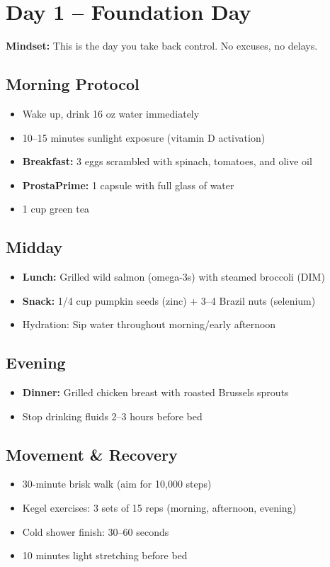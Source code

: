 \documentclass[11pt,oneside]{book}
\begin{document}
\clearpage
\chapter*{Day 1 – Foundation Day}

\textbf{Mindset:} This is the day you take back control. No excuses, no delays.

\section*{Morning Protocol}
\begin{itemize}[leftmargin=*]
\item Wake up, drink 16 oz water immediately
\item 10--15 minutes sunlight exposure (vitamin D activation)
\item \textbf{Breakfast:} 3 eggs scrambled with spinach, tomatoes, and olive oil
\item \textbf{ProstaPrime:} 1 capsule with full glass of water
\item 1 cup green tea
\end{itemize}

\section*{Midday}
\begin{itemize}[leftmargin=*]
\item \textbf{Lunch:} Grilled wild salmon (omega-3s) with steamed broccoli (DIM)
\item \textbf{Snack:} 1/4 cup pumpkin seeds (zinc) + 3--4 Brazil nuts (selenium)
\item Hydration: Sip water throughout morning/early afternoon
\end{itemize}

\section*{Evening}
\begin{itemize}[leftmargin=*]
\item \textbf{Dinner:} Grilled chicken breast with roasted Brussels sprouts
\item Stop drinking fluids 2--3 hours before bed
\end{itemize}

\section*{Movement \& Recovery}
\begin{itemize}[leftmargin=*]
\item 30-minute brisk walk (aim for 10,000 steps)
\item Kegel exercises: 3 sets of 15 reps (morning, afternoon, evening)
\item Cold shower finish: 30--60 seconds
\item 10 minutes light stretching before bed
\end{itemize}
\end{document}
